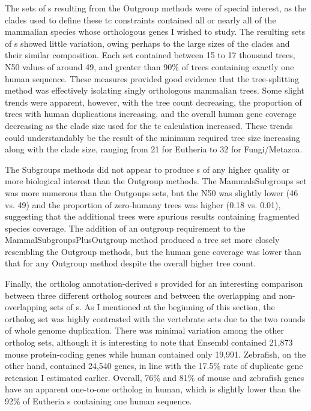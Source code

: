 The sets of \subtr{}s resulting from the Outgroup methods were of
special interest, as the clades used to define these \ac{tc} constraints
contained all or nearly all of the mammalian species whose orthologous
genes I wished to study. The resulting sets of \subtr{}s showed little
variation, owing perhaps to the large sizes of the clades and their
similar composition. Each set contained between 15 to 17 thousand
trees, N50 values of around 49, and greater than 90\% of trees
containing exactly one human sequence. These measures provided good
evidence that the tree-splitting method was effectively isolating
singly orthologous mammalian trees.  Some slight trends were apparent,
however, with the tree count decreasing, the proportion of trees with
human duplications increasing, and the overall human gene coverage
decreasing as the clade size used for the \ac{tc} calculation
increased. These trends could understandably be the result of the
minimum required tree size increasing along with the clade size,
ranging from 21 for Eutheria to 32 for Fungi/Metazoa.

The Subgroups methods did not appear to produce \subtr{}s of any
higher quality or more biological interest than the Outgroup
methods. The MammalsSubgroups set was more numerous than the Outgoups
sets, but the N50 was slightly lower (46 vs. 49) and the proportion of
zero-humany trees was higher (0.18 vs. 0.01), suggesting that the
additional trees were spurious results containing fragmented species
coverage. The addition of an outgroup requirement to the
MammalSubgroupsPlusOutgroup method produced a tree set more closely
resembling the Outgroup methods, but the human gene coverage was
lower than that for any Outgroup method despite the overall higher
tree count.

Finally, the ortholog annotation-derived \subtr{}s provided for an
interesting comparison between three different ortholog sources and
between the overlapping and non-overlapping sets of \subtr{}s. As I
mentioned at the beginning of this section, the 
ortholog set was highly contrasted with the vertebrate sets due to the
two rounds of whole genome duplication. There was minimal variation
among the other ortholog sets, although it is interesting to note that
Ensembl contained 21,873 mouse protein-coding genes while human
contained only 19,991. Zebrafish, on the other hand, contained 24,540
genes, in line with the 17.5\% rate of duplicate gene retension I
estimated earlier. Overall, 76\% and 81\% of mouse and zebrafish genes
have an apparent one-to-one ortholog in human, which is slightly lower
than the 92\% of Eutheria \subtr{}s containing one human sequence.

